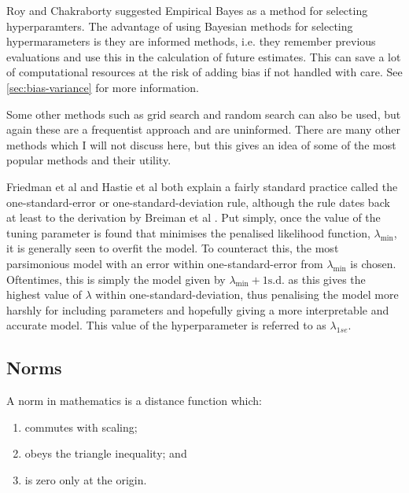 Roy and Chakraborty  suggested Empirical Bayes as a method for selecting hyperparamters. The advantage of using Bayesian methods for selecting hypermarameters is they are informed methods, i.e. they remember previous evaluations and use this in the calculation of future estimates. This can save a lot of computational resources at the risk of adding bias if not handled with care. See \cref{sec:bias-variance} for more information.

Some other methods such as grid search and random search can also be used, but again these are a frequentist approach and are uninformed. There are many other methods which I will not discuss here, but this gives an idea of some of the most popular methods and their utility.

Friedman et al  and Hastie et al  both explain a fairly standard practice called the one-standard-error or one-standard-deviation rule, although the rule dates back at least to the derivation by Breiman et al . Put simply, once the value of the tuning parameter is found that minimises the penalised likelihood function, $\lambda_{\min}$, it is generally seen to overfit the model. To counteract this, the most parsimonious model with an error within one-standard-error from $\lambda_{\min}$ is chosen. Oftentimes, this is simply the model given by $\lambda_{\min}+1\textrm{s.d.}$ as this gives the highest value of $\lambda$ within one-standard-deviation, thus penalising the model more harshly for including parameters and hopefully giving a more interpretable and accurate model. This value of the hyperparameter is referred to as $\lambda_{1se}$.

\subsection{Norms}

\begin{definition}[Norm]\label{def:norm}
A norm in mathematics is a distance function which:
\begin{spacing}{0}
\begin{enumerate}
    \item commutes with scaling;
    \item obeys the triangle inequality; and
    \item is zero only at the origin.
\end{enumerate}
\end{spacing}
\end{definition}

